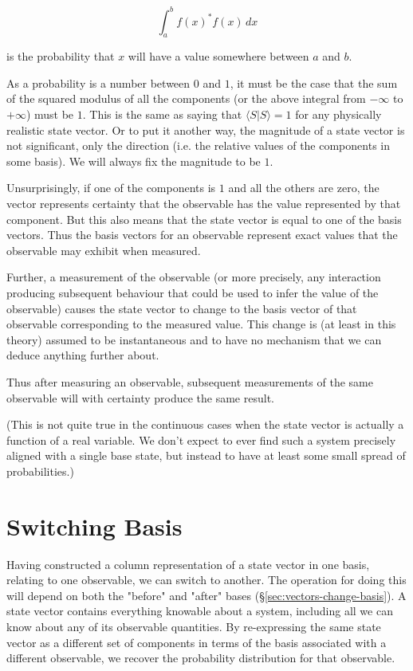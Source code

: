 $$\int_{a}^{b} f(x)^* f(x) \, dx$$

is the probability that $x$ will have a value somewhere between $a$ and $b$.

As a probability is a number between $0$ and $1$, it must be the case that the sum of the squared modulus of all the components (or the above integral from $-\infty$ to $+\infty$) must be $1$. This is the same as saying that $\langle S | S \rangle = 1$ for any physically realistic state vector. Or to put it another way, the magnitude of a state vector is not significant, only the direction (i.e. the relative values of the components in some basis). We will always fix the magnitude to be $1$.

Unsurprisingly, if one of the components is $1$ and all the others are zero, the vector represents certainty that the observable has the value represented by that component. But this also means that the state vector is equal to one of the basis vectors. Thus the basis vectors for an observable represent exact values that the observable may exhibit when measured.

Further, a measurement of the observable (or more precisely, any interaction producing subsequent behaviour that could be used to infer the value of the observable) causes the state vector to change to the basis vector of that observable corresponding to the measured value. This change is (at least in this theory) assumed to be instantaneous and to have no mechanism that we can deduce anything further about.

Thus after measuring an observable, subsequent measurements of the same observable will with certainty produce the same result.

(This is not quite true in the continuous cases when the state vector is actually a function of a real variable. We don't expect to ever find such a system precisely aligned with a single base state, but instead to have at least some small spread of probabilities.)

\section{Switching Basis}

Having constructed a column representation of a state vector in one basis, relating to one observable, we can switch to another. The operation for doing this will depend on both the "before" and "after" bases (§\ref{sec:vectors-change-basis}). A state vector contains everything knowable about a system, including all we can know about any of its observable quantities. By re-expressing the same state vector as a different set of components in terms of the basis associated with a different observable, we recover the probability distribution for that observable.

